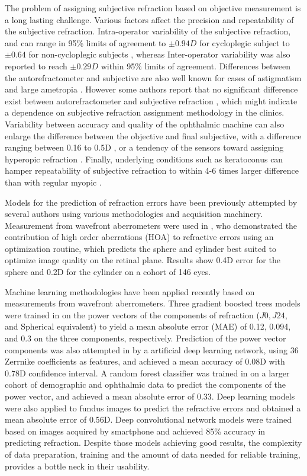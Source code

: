 \documentclass[article,twocolumn,preprint,10pt]{paper}%
\renewcommand{\(}{\left(}
\renewcommand{\)}{\right)}
\renewcommand{\[}{\left[}
\renewcommand{\]}{\right]}
\newcommand{\1}{\mbox{\boldmath$1$}}
\begin{document}
	The problem of assigning subjective refraction based on objective measurement is a long lasting challenge. Various factors affect the precision and repeatability of the subjective refraction\cite{elliott1997}. 
	Intra-operator variability of the subjective refraction, and can range in 95\% limits of agreement to  $\pm0.94D$ for cycloplegic subject to $\pm0.64$ for non-cycloplegic subjects \cite{zadnik1992}, whereas Inter-operator variability was also reported to reach $\pm0.29D$ \cite{bullimore1998,raasch1998} within 95\% limits of agreement. Differences between the autorefractometer and subjective are also well known for cases of astigmatism and large ametropia \cite{thompson1996}. However some authors report that no significant difference exist between autorefractometer and subjective refraction \cite{bennett2015}, which might indicate a dependence on subjective refraction assignment methodology in the clinics. Variability between accuracy and quality of the ophthalmic machine can also enlarge the difference between the objective and final subjective, with a difference ranging between 0.16 to 0.5D \cite{kumar2021}, or a tendency of the sensors toward assigning hyperopic refraction \cite{choong2006}. Finally, underlying conditions such as keratoconus can hamper repeatability of subjective refraction to within 4-6 times larger difference than with regular myopic \cite{raasch2001}.
	
	Models for the prediction of refraction errors have been previously attempted by several authors using various methodologies and acquisition machinery. Measurement from wavefront aberrometers were used in \cite{guirao2003}, who demonstrated the contribution of high order aberrations (HOA) to refractive errors using an optimization routine, which predicts the sphere and cylinder best suited to optimize image quality on the retinal plane. Results show 0.4D error for the sphere and 0.2D for the cylinder on a cohort of 146 eyes.
	
	Machine learning methodologies have been applied recently based on measurements from wavefront aberrometers. Three gradient boosted trees models were trained in \cite{rampat2020} on the power vectors of the components of refraction ($J0,J24$, and Spherical equivalent) to yield a mean absolute error (MAE) of 0.12, 0.094, and 0.3 on the three components, respectively. Prediction of the power vector components was also attempted in \cite{leube2019} by a artificial deep learning network, using 36 Zerrnike coefficients as features, and achieved a mean accuracy of 0.08D with 0.78D confidence interval. A random forest classifier was trained in \cite{de2020} on a larger cohort of demographic and ophthalmic data to predict the components of the power vector, and achieved a mean absolute error of 0.33.  Deep learning models were also applied to fundus images to predict the refractive errors \cite{varadarajan2018} and obtained a mean absolute error of 0.56D. Deep convolutional network models were trained  \cite{chun2020} based on images acquired by smartphone and achieved 85\% accuracy in predicting refraction. Despite those models achieving good results, the complexity of data preparation, training and the amount of data needed for reliable training, provides a bottle neck in their usability. 
	
\end{document}
